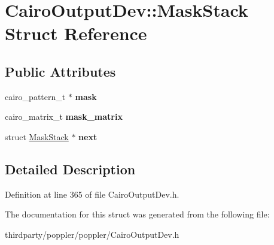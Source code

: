 \hypertarget{struct_cairo_output_dev_1_1_mask_stack}{}\section{Cairo\+Output\+Dev\+:\+:Mask\+Stack Struct Reference}
\label{struct_cairo_output_dev_1_1_mask_stack}
\subsection*{Public Attributes}
\begin{DoxyCompactItemize}
\item 
\mbox{\label{struct_cairo_output_dev_1_1_mask_stack_a813c03f3fe318e784ba40143213f131b}} 
cairo\+\_\+pattern\+\_\+t $\ast$ {\bfseries mask}
\item 
\mbox{\label{struct_cairo_output_dev_1_1_mask_stack_a6b82b80caba9ae007bf63831f148d5ef}} 
cairo\+\_\+matrix\+\_\+t {\bfseries mask\+\_\+matrix}
\item 
\mbox{\label{struct_cairo_output_dev_1_1_mask_stack_a47ed54ae83b304da6cff0bdf19e8ce24}} 
struct \hyperlink{struct_cairo_output_dev_1_1_mask_stack}{Mask\+Stack} $\ast$ {\bfseries next}
\end{DoxyCompactItemize}


\subsection{Detailed Description}


Definition at line 365 of file Cairo\+Output\+Dev.\+h.



The documentation for this struct was generated from the following file\+:\begin{DoxyCompactItemize}
\item 
thirdparty/poppler/poppler/Cairo\+Output\+Dev.\+h\end{DoxyCompactItemize}
